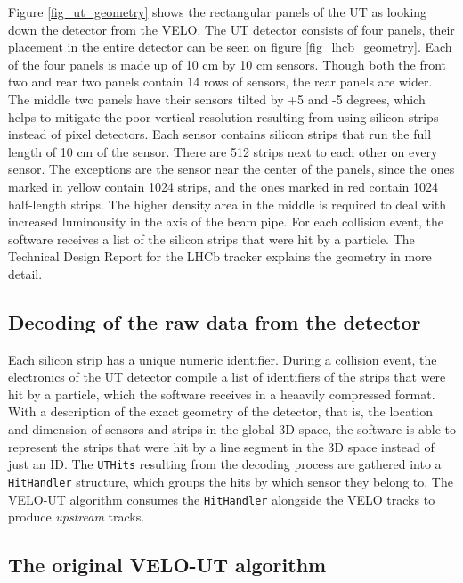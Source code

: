 \documentclass[12pt]{article}
\newcommand{\code}[1]{\texttt{#1}}
\begin{document}
Figure \ref{fig_ut_geometry} shows the rectangular panels of the UT as looking down the detector from the VELO. The UT detector consists of four panels, their placement in the entire detector can be seen on figure \ref{fig_lhcb_geometry}. Each of the four panels is made up of 10 cm by 10 cm sensors. Though both the front two and rear two panels contain 14 rows of sensors, the rear panels are wider. The middle two panels have their sensors tilted by +5 and -5 degrees, which helps to mitigate the poor vertical resolution resulting from using silicon strips instead of pixel detectors. Each sensor contains silicon strips that run the full length of 10 cm of the sensor. There are 512 strips next to each other on every sensor. The exceptions are the sensor near the center of the panels, since the ones marked in yellow contain 1024 strips, and the ones marked in red contain 1024 half-length strips. The higher density area in the middle is required to deal with increased luminousity in the axis of the beam pipe. For each collision event, the software receives a list of the silicon strips that were hit by a particle. The Technical Design Report for the LHCb tracker\cite{tracker_tdr} explains the geometry in more detail.


\subsection{Decoding of the raw data from the detector}

Each silicon strip has a unique numeric identifier. During a collision event, the electronics of the UT detector compile a list of identifiers of the strips that were hit by a particle, which the software receives in a heaavily compressed format. With a description of the exact geometry of the detector, that is, the location and dimension of sensors and strips in the global 3D space, the software is able to represent the strips that were hit by a line segment in the 3D space instead of just an ID. The \code{UTHits} resulting from the  decoding process are gathered into a \code{HitHandler} structure, which groups the hits by which sensor they belong to. The VELO-UT algorithm consumes the \code{HitHandler} alongside the VELO tracks to produce \textit{upstream} tracks.


\subsection{The original VELO-UT algorithm}\label{sec_velout_desc}
\end{document}
